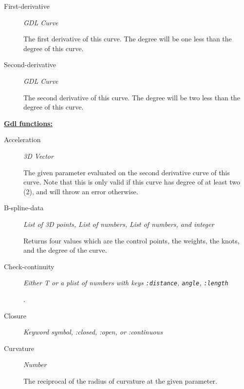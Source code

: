 \documentclass [11pt]{book}
\begin{document}
\begin{itemize}
\begin{description}
\item [First-derivative]
\emph{GDL Curve}

 The first derivative of this curve. The degree will be one less than the degree of this curve.




\item [Second-derivative]
\emph{GDL Curve}

 The second derivative of this curve. The degree will be two less than the degree of this curve.




\end{description}






\textbf{
\underline{Gdl functions:}}

\begin{description}

\item [Acceleration]
\emph{3D Vector}

 The given parameter evaluated on the second derivative curve of this curve. Note that this is
only valid if this curve has degree of at least two (2), and will throw an error otherwise.




\item [B-spline-data]
\emph{List of 3D points, List of numbers, List of numbers, and integer}

 Returns four values which are
the control points, the weights, the knots, and the degree of the curve.




\item [Check-continuity]
\emph{Either T or a plist of numbers with keys \texttt{:distance}, \texttt{angle}, \texttt{:length}}

.




\item [Closure]
\emph{Keyword symbol, :closed, :open, or :continuous}





\item [Curvature]
\emph{Number}

 The reciprocal of the radius of curvature at the given parameter.





\end{description}
\end{itemize}
\end{document}
